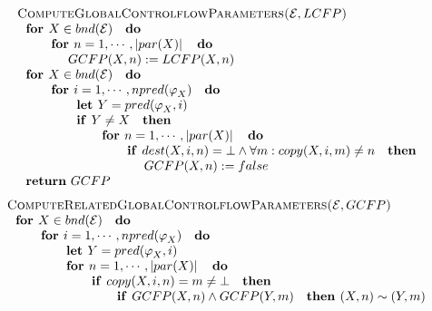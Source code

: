 \documentclass{article}
\begin{document}
\begin{equation*}
\begin{tabular}{l}
\textsc{ComputeGlobalControlflowParameters(}$\mathcal{E},LCFP$\textsc{)} \\ 
$\text{\textbf{for }}X\in bnd(\mathcal{E})\text{ \textbf{do}}$ \\ 
$\qquad \text{\textbf{for }}n=1,\cdots ,\left\vert par(X)\right\vert \text{ 
\textbf{do}}$ \\ 
$\qquad \qquad GCFP(X,n):=LCFP(X,n)$ \\ 
$\text{\textbf{for }}X\in bnd(\mathcal{E})\text{ \textbf{do}}$ \\ 
$\qquad \text{\textbf{for }}i=1,\cdots ,npred(\varphi _{X})\text{ \textbf{do}%
}$ \\ 
$\qquad \qquad \text{\textbf{let }}Y=pred(\varphi _{X},i)$ \\ 
$\qquad \qquad \text{\textbf{if }}Y\neq X\text{ \textbf{then}}$ \\ 
$\qquad \qquad \qquad \text{\textbf{for }}n=1,\cdots ,\left\vert
par(X)\right\vert \text{ \textbf{do}}$ \\ 
$\qquad \qquad \qquad \qquad \text{\textbf{if }}dest(X,i,n)=\bot \wedge
\forall m:copy(X,i,m)\neq n\text{ \textbf{then}}$ \\ 
$\qquad \qquad \qquad \qquad \qquad GCFP(X,n):=false$ \\ 
$\text{\textbf{return} }GCFP$%
\end{tabular}%
\end{equation*}%
\newline
\begin{equation*}
\begin{tabular}{l}
\textsc{ComputeRelatedGlobalControlflowParameters(}$\mathcal{E},GCFP$\textsc{%
)} \\ 
$\text{\textbf{for }}X\in bnd(\mathcal{E})\text{ \textbf{do}}$ \\ 
$\qquad \text{\textbf{for }}i=1,\cdots ,npred(\varphi _{X})\text{ \textbf{do}%
}$ \\ 
$\qquad \qquad \text{\textbf{let }}Y=pred(\varphi _{X},i)$ \\ 
$\qquad \qquad \text{\textbf{for }}n=1,\cdots ,\left\vert par(X)\right\vert 
\text{ \textbf{do}}$ \\ 
$\qquad \qquad \qquad \text{\textbf{if }}copy(X,i,n)=m\neq \bot \text{ 
\textbf{then}}$ \\ 
$\qquad \qquad \qquad \qquad \text{\textbf{if }}GCFP(X,n)\wedge GCFP(Y,m)%
\text{ \textbf{then }}(X,n)\sim (Y,m)$%
\end{tabular}%
\end{equation*}%
\newpage 
\end{document}
